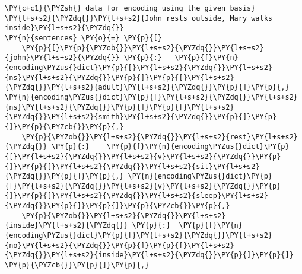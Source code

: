     \begin{tcolorbox}[breakable, size=fbox, boxrule=1pt, pad at break*=1mm,colback=cellbackground, colframe=cellborder]
\begin{Verbatim}[commandchars=\\\{\}]
\PY{c+c1}{\PYZsh{} data for encoding using the given basis}
\PY{l+s+s2}{\PYZdq{}}\PY{l+s+s2}{John rests outside, Mary walks inside}\PY{l+s+s2}{\PYZdq{}}
\PY{n}{sentences} \PY{o}{=} \PY{p}{[}
    \PY{p}{[}\PY{p}{\PYZob{}}\PY{l+s+s2}{\PYZdq{}}\PY{l+s+s2}{john}\PY{l+s+s2}{\PYZdq{}} \PY{p}{:}   \PY{p}{[}\PY{n}{encoding\PYZus{}dict}\PY{p}{[}\PY{l+s+s2}{\PYZdq{}}\PY{l+s+s2}{ns}\PY{l+s+s2}{\PYZdq{}}\PY{p}{]}\PY{p}{[}\PY{l+s+s2}{\PYZdq{}}\PY{l+s+s2}{adult}\PY{l+s+s2}{\PYZdq{}}\PY{p}{]}\PY{p}{,} \PY{n}{encoding\PYZus{}dict}\PY{p}{[}\PY{l+s+s2}{\PYZdq{}}\PY{l+s+s2}{ns}\PY{l+s+s2}{\PYZdq{}}\PY{p}{]}\PY{p}{[}\PY{l+s+s2}{\PYZdq{}}\PY{l+s+s2}{smith}\PY{l+s+s2}{\PYZdq{}}\PY{p}{]}\PY{p}{]}\PY{p}{\PYZcb{}}\PY{p}{,}
    \PY{p}{\PYZob{}}\PY{l+s+s2}{\PYZdq{}}\PY{l+s+s2}{rest}\PY{l+s+s2}{\PYZdq{}} \PY{p}{:}    \PY{p}{[}\PY{n}{encoding\PYZus{}dict}\PY{p}{[}\PY{l+s+s2}{\PYZdq{}}\PY{l+s+s2}{v}\PY{l+s+s2}{\PYZdq{}}\PY{p}{]}\PY{p}{[}\PY{l+s+s2}{\PYZdq{}}\PY{l+s+s2}{sit}\PY{l+s+s2}{\PYZdq{}}\PY{p}{]}\PY{p}{,} \PY{n}{encoding\PYZus{}dict}\PY{p}{[}\PY{l+s+s2}{\PYZdq{}}\PY{l+s+s2}{v}\PY{l+s+s2}{\PYZdq{}}\PY{p}{]}\PY{p}{[}\PY{l+s+s2}{\PYZdq{}}\PY{l+s+s2}{sleep}\PY{l+s+s2}{\PYZdq{}}\PY{p}{]}\PY{p}{]}\PY{p}{\PYZcb{}}\PY{p}{,}
    \PY{p}{\PYZob{}}\PY{l+s+s2}{\PYZdq{}}\PY{l+s+s2}{inside}\PY{l+s+s2}{\PYZdq{}} \PY{p}{:}  \PY{p}{[}\PY{n}{encoding\PYZus{}dict}\PY{p}{[}\PY{l+s+s2}{\PYZdq{}}\PY{l+s+s2}{no}\PY{l+s+s2}{\PYZdq{}}\PY{p}{]}\PY{p}{[}\PY{l+s+s2}{\PYZdq{}}\PY{l+s+s2}{inside}\PY{l+s+s2}{\PYZdq{}}\PY{p}{]}\PY{p}{]} \PY{p}{\PYZcb{}}\PY{p}{]}\PY{p}{,}


\end{Verbatim}
\end{tcolorbox}
